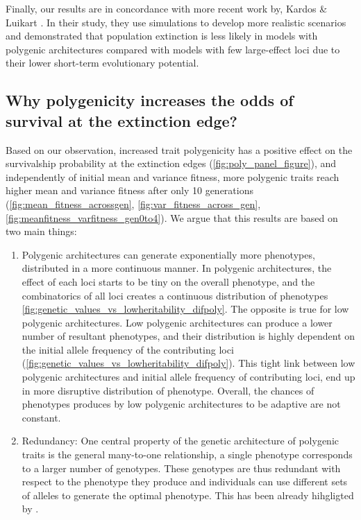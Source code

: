 \documentclass{article}
\begin{document}
Finally, our results are in concordance with more recent work by, Kardos \& Luikart  \citep{Kardos2021-jd}. In their study,  they use simulations to develop more realistic scenarios and demonstrated that population extinction is less likely in models with polygenic architectures compared with models with few large-effect loci due to their lower short-term evolutionary potential.

\subsection{Why polygenicity increases the odds of survival at the extinction edge?}
Based on our observation, increased trait polygenicity has a positive effect on the survivalship probability at the extinction edges (\ref{fig:poly_panel_figure}), and independently of initial mean and variance fitness, more polygenic traits reach higher mean  and variance fitness after only 10 generations (\ref{fig:mean_fitness_acrossgen},  \ref{fig:var_fitness_across_gen}, \ref{fig:meanfitness_varfitness_gen0to4}). We argue that this results are based on two main things: 
\begin{enumerate}
    \item Polygenic architectures can generate exponentially more phenotypes, distributed in a more continuous manner. In polygenic architectures, the effect of each loci starts to be tiny on the overall phenotype, and the combinatorics of all loci creates a continuous distribution of phenotypes \ref{fig:genetic_values_vs_lowheritability_difpoly}. The opposite is true for low polygenic architectures. Low polygenic architectures can produce a lower number of resultant phenotypes, and their distribution is highly dependent on the initial allele frequency of the contributing loci (\ref{fig:genetic_values_vs_lowheritability_difpoly}). This tight link between low polygenic architectures and initial allele frequency of contributing loci, end up in more disruptive distribution of phenotype. Overall, the chances of phenotypes produces by low polygenic architectures to be adaptive are not constant. 

    \item Redundancy: One central property of the genetic architecture of polygenic traits is the general many-to-one relationship, a single phenotype corresponds to a larger number of genotypes. These genotypes are thus redundant with respect to the phenotype they produce and individuals can use different sets of alleles to generate the optimal phenotype. This has been already hihgligted by \citep{Orr2008-jl}. 
\end{enumerate}
\end{document}
